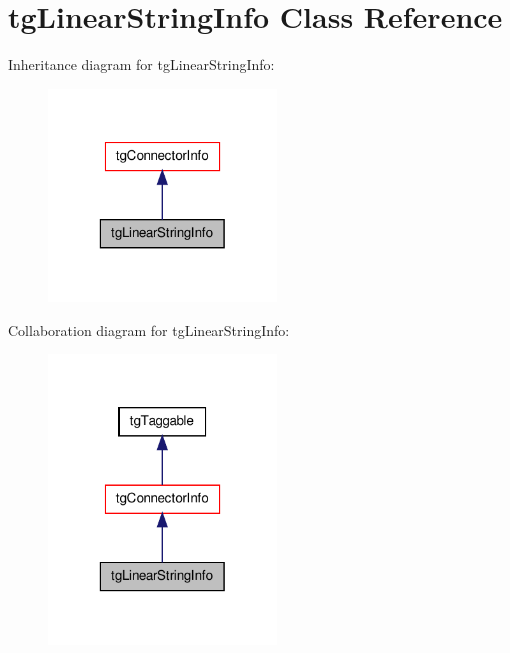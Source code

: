 \hypertarget{classtg_linear_string_info}{\section{tg\-Linear\-String\-Info Class Reference}
\label{classtg_linear_string_info}
}


Inheritance diagram for tg\-Linear\-String\-Info\-:\nopagebreak
\begin{figure}[H]
\begin{center}
\leavevmode
\includegraphics[width=172pt]{classtg_linear_string_info__inherit__graph}
\end{center}
\end{figure}


Collaboration diagram for tg\-Linear\-String\-Info\-:\nopagebreak
\begin{figure}[H]
\begin{center}
\leavevmode
\includegraphics[width=172pt]{classtg_linear_string_info__coll__graph}
\end{center}
\end{figure}

